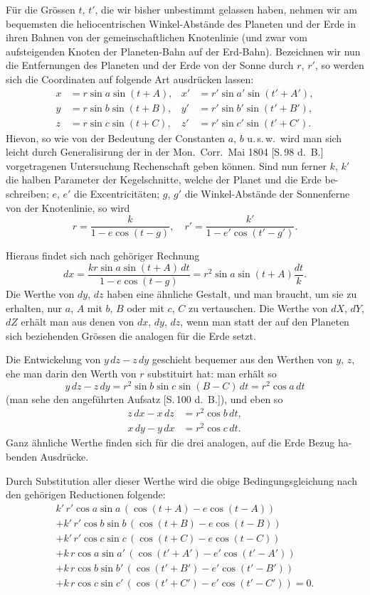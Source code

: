 \documentclass[12pt,a4paper]{article}
\begin{document}
Für die Grössen $t$, $t'$, die wir bisher unbestimmt gelassen haben, nehmen
wir am bequemsten die heliocentrischen Winkel-Abstände des Planeten und der
Erde in ihren Bahnen von der gemeinschaftlichen Knotenlinie (und zwar vom
aufsteigenden Knoten der Planeten-Bahn auf der Erd-Bahn). Bezeichnen wir
nun die Entfernungen des Planeten und der Erde von der Sonne durch $r$, $r'$, so
werden sich die Coordinaten auf folgende Art ausdrücken lassen:
\begin{align*}
x &= r\sin a\sin(t+A), & x' &= r'\sin a'\sin(t'+A'),\\
y &= r\sin b\sin(t+B), & y' &= r'\sin b'\sin(t'+B'),\\
z &= r\sin c\sin(t+C), & z' &= r'\sin c'\sin(t'+C').
\end{align*}
Hievon, so wie von der Bedeutung der Constanten $a$, $b$ u.\,s.\,w.\ wird man
sich leicht durch Generalisirung der in der Mon.\ Corr.\ Mai 1804 [S.\,98 d.\ B.]
vorgetragenen Untersuchung Rechenschaft geben können. Sind nun ferner $k$, $k'$
die halben Parameter der Kegelschnitte, welche der Planet und die Erde be-
schreiben; $e$, $e'$ die Excentricitäten; $g$, $g'$ die Winkel-Abstände der Sonnenferne
von der Knotenlinie, so wird
\[
r = \frac{k}{1 - e\cos(t-g)},\quad r' = \frac{k'}{1 - e'\cos(t'-g')}.
\]

Hieraus findet sich nach gehöriger Rechnung
\[
dx = \frac{kr\sin a\sin(t+A)\,dt}{1 - e\cos(t-g)} = r^2\sin a\sin(t+A)\frac{dt}{k}.
\]
Die Werthe von $dy$, $dz$ haben eine ähnliche Gestalt, und man braucht,
um sie zu erhalten, nur $a$, $A$ mit $b$, $B$ oder mit $c$, $C$ zu vertauschen. Die
Werthe von $dX$, $dY$, $dZ$ erhält man aus denen von $dx$, $dy$, $dz$, wenn man statt
der auf den Planeten sich beziehenden Grössen die analogen für die Erde setzt.

Die Entwickelung von $y\,dz - z\,dy$ geschieht bequemer aus den Werthen
von $y$, $z$, ehe man darin den Werth von $r$ substituirt hat: man erhält so
\[
y\,dz - z\,dy = r^2\sin b\sin c\sin(B-C)\,dt = r^2\cos a\,dt
\]
(man sehe den angeführten Aufsatz [S.\,100 d.\ B.]), und eben so
\begin{align*}
z\,dx - x\,dz &= r^2\cos b\,dt,\\
x\,dy - y\,dx &= r^2\cos c\,dt.
\end{align*}
Ganz ähnliche Werthe finden sich für die drei analogen, auf die Erde Bezug ha-
benden Ausdrücke.

Durch Substitution aller dieser Werthe wird die obige Bedingungsgleichung
nach den gehörigen Reductionen folgende:
\begin{multline*}
k'\,r'\cos a\sin a\,(\cos(t+A) - e\cos(t-A))\\
+ k'\,r'\cos b\sin b\,(\cos(t+B) - e\cos(t-B))\\
+ k'\,r'\cos c\sin c\,(\cos(t+C) - e\cos(t-C))\\
+ k\,r\cos a\sin a'\,(\cos(t'+A') - e'\cos(t'-A'))\\
+ k\,r\cos b\sin b'\,(\cos(t'+B') - e'\cos(t'-B'))\\
+ k\,r\cos c\sin c'\,(\cos(t'+C') - e'\cos(t'-C')) = 0.
\end{multline*}
\end{document}
